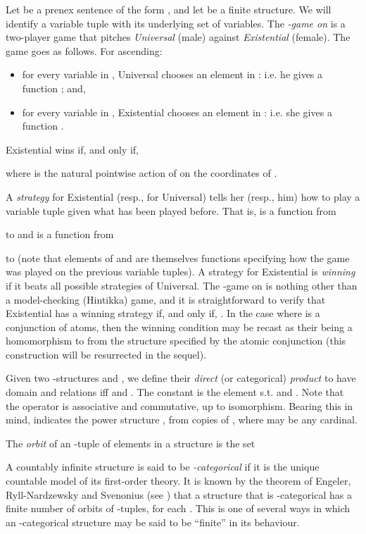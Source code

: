 \documentclass{LMCS}
\begin{document}
Let  be a prenex sentence of the form , and let  be a finite structure. We will identify a variable tuple  with its underlying set of variables. The \emph{-game on } is a two-player game that pitches
\emph{Universal} (male) against \emph{Existential} (female). 
The game goes as follows.
For  ascending: 
\begin{itemize}
\item for every variable in , Universal chooses an element in
  : i.e. he gives a function ;
  and, 
\item for every variable in , Existential chooses an element in
  : i.e. she gives a function .
\end{itemize}
Existential wins if, and only if, 

where  is the natural pointwise action of  on the coordinates of . 


A \emph{strategy}  for Existential (resp.,  for Universal) tells
her (resp., him) how to play a variable tuple given what has been played
before. That is,  is a function from 

to  and  is a function from 

to  (note that elements of  and  are themselves functions specifying how the game was played on the previous variable tuples). 
A strategy for Existential is \emph{winning} if it beats all possible strategies of Universal. The -game on  is nothing other than a model-checking (Hintikka) game, and it is straightforward to verify that Existential has a winning strategy if, and only if, . In the case where  is a conjunction of atoms, then the winning condition may be recast as their being a homomorphism to  from the structure specified by the atomic conjunction  (this construction will be resurrected in the sequel). 

Given two -structures  and , we define their \emph{direct} (or categorical) \emph{product}  to have domain  and relations
 iff  and . The constant  is the element  s.t.  and . Note that the operator  is associative and commutative, up to isomorphism. Bearing this in mind,  indicates the power structure , from  copies of , where  may be any cardinal.

The \emph{orbit} of an -tuple  of elements in a structure  is the set 

A countably infinite structure is said to be \emph{-categorical} if it is the unique countable model of its first-order theory. It is known by the theorem of Engeler, Ryll-Nardzewsky and Svenonius (see \cite{Hodges}) that a structure that is -categorical has a finite number of orbits of -tuples, for each . This is one of several ways in which an -categorical structure may be said to be ``finite'' in its behaviour.
\end{document}

